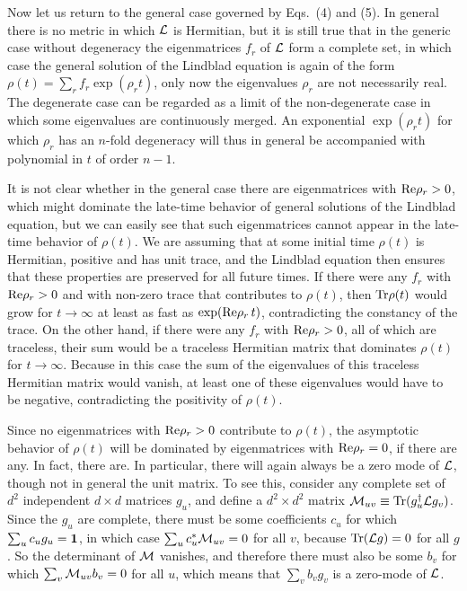 Now let us return to the general case governed by Eqs.~(4) and (5).  In general there is no metric in which ${\cal L}$ is Hermitian, but it is still true that in the generic case without degeneracy the eigenmatrices $f_r$ of ${\cal L}$ form a complete set, in which case the general solution of the Lindblad equation is again of the form $\rho(t)=\sum_r f_r\exp(\rho_r t)$, only now the eigenvalues $\rho_r$ are not necessarily real.  The degenerate case can be regarded as a limit of the non-degenerate case in which some eigenvalues are continuously merged.  An exponential $\exp(\rho_r t)$ for which $\rho_r$ has an $n$-fold degeneracy will thus in general be accompanied with polynomial in $t$ of order $n-1$.

It is not clear whether in the general case  there are  eigenmatrices with ${\rm Re}\rho_r>0$, which might dominate the late-time behavior of general solutions of the Lindblad equation, but we can easily see that such eigenmatrices cannot appear in the late-time behavior of $\rho(t)$.  We are assuming that at some initial time $\rho(t)$ is Hermitian, positive and has unit trace, and the Lindblad equation then ensures that these properties are preserved for all future times.  If there were any $f_r$ with ${\rm Re}\rho_r>0$ and with non-zero trace that contributes to $\rho(t)$, then ${\rm Tr}\rho(t)$ would grow for $t\rightarrow\infty$  at least as fast as $\exp({\rm Re}\rho_r\,t)$, contradicting the constancy of the trace.  On the other hand, if there were any $f_r$ with ${\rm Re}\rho_r>0$, all of which are traceless, their sum would be a traceless Hermitian matrix that dominates $ \rho(t)$ for $t\rightarrow\infty$.  Because  in this case the sum of the eigenvalues of this traceless Hermitian matrix would vanish, at least one of these eigenvalues would have to be negative,  contradicting the positivity of $\rho(t)$.

Since no eigenmatrices with ${\rm Re}\rho_r>0$ contribute to $\rho(t)$, the asymptotic behavior of $\rho(t)$ will be dominated by eigenmatrices with ${\rm Re}\rho_r=0$, if there are any.  In fact, there are.  In particular,
there will again always be a zero mode of ${\cal L}$, though not in general the unit matrix.  To see this, consider any complete set of $d^2$ independent $d\times d$ matrices $g_u$, and define a $d^2\times d^2$ matrix ${\cal M}_{uv}\equiv {\rm Tr}(g_u^\dagger {\cal L} g_v)$.  Since the $g_u$ are complete, there must be some coefficients $c_u$ for which $\sum_u c_u g_u=\mbox{\boldmath{$1$}}$, in which case $\sum_u c^*_u {\cal M}_{uv}=0$ for all $v$, because ${\rm Tr}({\cal L}g)=0$ for all $g$.  So the determinant of ${\cal M}$ vanishes, and therefore there must also be some $b_v$ for which $\sum_v {\cal M}_{uv}b_v=0$ for all $u$, which means that $ \sum_v b_v g_v$ is a zero-mode of ${\cal L}$.  

